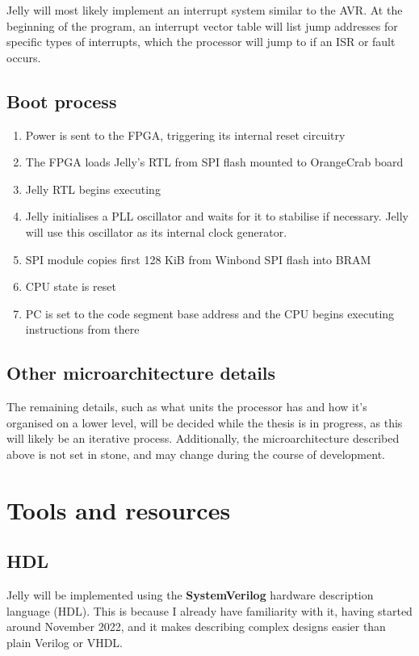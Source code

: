\documentclass{article}
\begin{document}
Jelly will most likely implement an interrupt system similar to the AVR. At the beginning of the program, an
interrupt vector table will list jump addresses for specific types of interrupts, which the processor will
jump to if an ISR or fault occurs.

\subsection{Boot process}
\begin{enumerate}
	\item Power is sent to the FPGA, triggering its internal reset circuitry
	\item The FPGA loads Jelly's RTL from SPI flash mounted to OrangeCrab board
	\item Jelly RTL begins executing
	\item Jelly initialises a PLL oscillator and waits for it to stabilise if necessary. Jelly will use this
		oscillator as its internal clock generator.
	\item SPI module copies first 128 KiB from Winbond SPI flash into BRAM
	\item CPU state is reset
	\item PC is set to the code segment base address and the CPU begins executing instructions from there
\end{enumerate}

\subsection{Other microarchitecture details}
The remaining details, such as what units the processor has and how it's organised on a lower level, will be
decided while the thesis is in progress, as this will likely be an iterative process. Additionally, the 
microarchitecture described above is not set in stone, and may change during the course of development.

\section{Tools and resources}
\subsection{HDL}
Jelly will be implemented using the \textbf{SystemVerilog} hardware description language (HDL). This is
because I already have familiarity with it, having started around November 2022, and it makes describing
complex designs easier than plain Verilog or VHDL.
\end{document}
